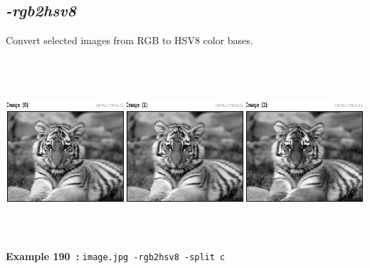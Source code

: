 \documentclass[a4paper,11pt,twoside]{book}
\begin{document}
\subsection{\emph{-rgb2hsv8} }\vspace*{-0.5em}
Convert selected images from RGB to HSV8 color bases.
\begin{center}\includegraphics[keepaspectratio=true,height=7cm,width=\textwidth]{img/gmic_def190.jpg}\\
{\footnotesize \textbf{Example 190~:} \texttt{image.jpg -rgb2hsv8 -split c}}
\end{center}
\end{document}
